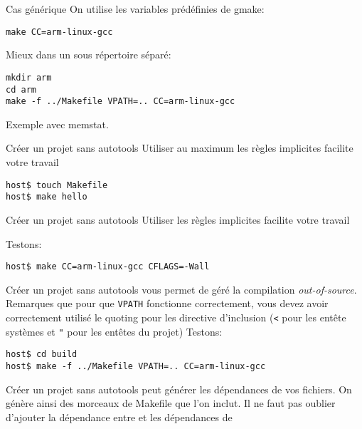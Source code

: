 \begin{frame}[fragile=singleslide]{Cas générique}
  On utilise les variables prédéfinies de gmake:
  \begin{lstlisting}
make CC=arm-linux-gcc
  \end{lstlisting}
  Mieux dans un sous répertoire séparé:
  \begin{lstlisting}
mkdir arm
cd arm
make -f ../Makefile VPATH=.. CC=arm-linux-gcc
  \end{lstlisting}
  Exemple avec memstat.
\end{frame}

\begin{frame}[fragile=singleslide]{Créer un projet sans autotools}
  Utiliser au maximum les règles implicites facilite votre travail
  \begin{lstlisting}
host$ touch Makefile
host$ make hello
  \end{lstlisting} %
\end{frame}

\begin{frame}[fragile=singleslide]{Créer un projet sans autotools}
  Utiliser les règles implicites facilite votre travail
  
  Testons:
\begin{lstlisting}
host$ make CC=arm-linux-gcc CFLAGS=-Wall
\end{lstlisting} %
\end{frame}

\begin{frame}[fragile=singleslide]{Créer un projet sans autotools}
   vous permet de géré la compilation \emph{out-of-source}.
  Remarques que pour que \verb+VPATH+ fonctionne correctement, vous devez avoir
  correctement utilisé le quoting pour les directive d'inclusion (\verb+<+ pour
  les entête systèmes et \verb+"+ pour les entêtes du projet)
  Testons:
\begin{lstlisting}
host$ cd build
host$ make -f ../Makefile VPATH=.. CC=arm-linux-gcc
\end{lstlisting} %
\end{frame}

\begin{frame}[fragile=singleslide]{Créer un projet sans autotools}
   peut  générer les dépendances de vos  fichiers.  On génère
  ainsi  des morceaux  de Makefile  que l'on  inclut. Il  ne  faut pas
  oublier   d'ajouter  la  dépendance   entre     et  les
  dépendances de 
  
\end{frame}


